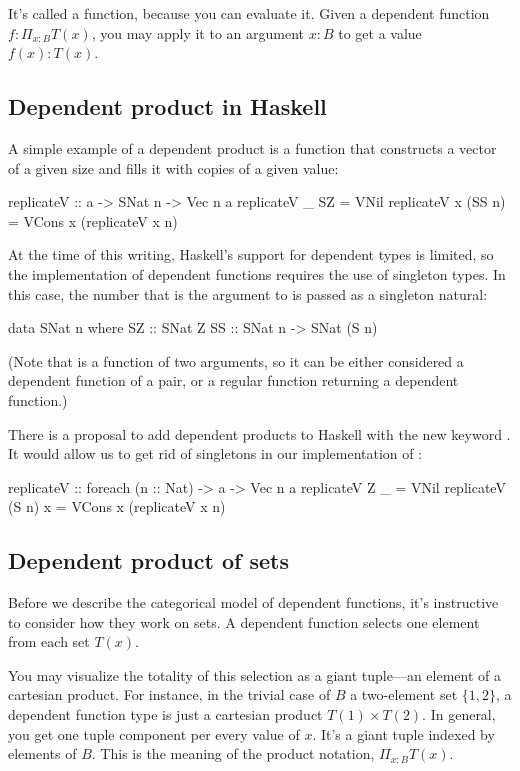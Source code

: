 \documentclass[DaoFP]{subfiles}
\begin{document}
It's called a function, because you can evaluate it. Given a dependent function  $f \colon \Pi_{x:B} T(x)$, you may apply it to an argument $x\colon B$ to get a value $f(x) \colon T(x)$.

\subsection{Dependent product in Haskell}
A simple example of a dependent product is a function that constructs a vector of a given size and fills it with copies of a given value:
\begin{haskell}
replicateV :: a -> SNat n -> Vec n a
replicateV _ SZ  = VNil
replicateV x (SS n) = VCons x (replicateV x n)
\end{haskell}

At the time of this writing, Haskell's support for dependent types is limited, so the implementation of dependent functions requires the use of singleton types. In this case, the number that is the argument to  is passed as a singleton natural:
\begin{haskell}
data SNat n where
  SZ :: SNat Z
  SS :: SNat n -> SNat (S n)
\end{haskell}
(Note that  is a function of two arguments, so it can be either considered a dependent function of a pair, or a regular function returning a dependent function.)

There is a proposal to add dependent products to Haskell with the new keyword . It would allow us to get rid of singletons in our implementation of :
\begin{haskell}
replicateV :: foreach (n :: Nat) -> a -> Vec n a
replicateV Z _  = VNil
replicateV (S n) x = VCons x (replicateV x n)
\end{haskell}

\subsection{Dependent product of sets}
Before we describe the categorical model of dependent functions, it's instructive to consider how they work on sets. A dependent function selects one element from each set $T(x)$. 

You may visualize the totality of this selection as a giant tuple---an element of a cartesian product. For instance, in the trivial case of $B$ a two-element set $\{1, 2\}$, a dependent function type is just a cartesian product $T(1) \times T(2)$. In general, you get one tuple component per every value of $x$. It's a giant tuple indexed by elements of $B$. This is the meaning of the product notation, $\Pi_{x:B} T(x)$. 
\end{document}
